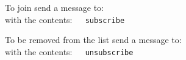 \smallskip\noindent
To join send a message to: 
\\
with the contents:~~\texttt{ subscribe }


\smallskip\noindent
To be removed from the list send a message to:
\\
with the contents:~~\texttt{ unsubscribe }




